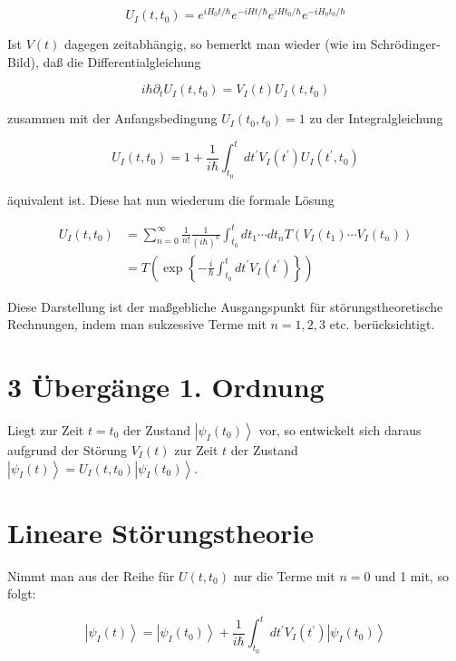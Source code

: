 \documentclass[10pt, letterpaper]{article}
\begin{document}
$$
U_{I}\left(t, t_{0}\right)=e^{i H_{0} t / \hbar} e^{-i H t / \hbar} e^{i H t_{0} / \hbar} e^{-i H_{0} t_{0} / \hbar}
$$

Ist $V(t)$ dagegen zeitabhängig, so bemerkt man wieder (wie im Schrödinger-Bild), daß die Differentialgleichung

$$
i \hbar \partial_{t} U_{I}\left(t, t_{0}\right)=V_{I}(t) U_{I}\left(t, t_{0}\right)
$$

zusammen mit der Anfangsbedingung $U_{I}\left(t_{0}, t_{0}\right)=1$ zu der Integralgleichung

$$
U_{I}\left(t, t_{0}\right)=1+\frac{1}{i \hbar} \int_{t_{0}}^{t} d t^{\prime} V_{I}\left(t^{\prime}\right) U_{I}\left(t^{\prime}, t_{0}\right)
$$

äquivalent ist. Diese hat nun wiederum die formale Lösung

$$
\begin{aligned}
U_{I}\left(t, t_{0}\right) & =\sum_{n=0}^{\infty} \frac{1}{n!} \frac{1}{(i \hbar)^{n}} \int_{t_{0}}^{t} d t_{1} \cdots d t_{n} T\left(V_{I}\left(t_{1}\right) \cdots V_{I}\left(t_{n}\right)\right) \\
& =T\left(\exp \left\{-\frac{i}{\hbar} \int_{t_{0}}^{t} d t^{\prime} V_{I}\left(t^{\prime}\right)\right\}\right)
\end{aligned}
$$

Diese Darstellung ist der maßgebliche Ausgangspunkt für störungstheoretische Rechnungen, indem man sukzessive Terme mit $n=1,2,3$ etc. berücksichtigt.

\section*{3 Übergänge 1. Ordnung}
Liegt zur Zeit $t=t_{0}$ der Zustand $\left|\psi_{I}\left(t_{0}\right)\right\rangle$ vor, so entwickelt sich daraus aufgrund der Störung $V_{I}(t)$ zur Zeit $t$ der Zustand $\left|\psi_{I}(t)\right\rangle=U_{I}\left(t, t_{0}\right)\left|\psi_{I}\left(t_{0}\right)\right\rangle$.

\section*{Lineare Störungstheorie}
Nimmt man aus der Reihe für $U\left(t, t_{0}\right)$ nur die Terme mit $n=0$ und 1 mit, so folgt:

$$
\left|\psi_{I}(t)\right\rangle=\left|\psi_{I}\left(t_{0}\right)\right\rangle+\frac{1}{i \hbar} \int_{t_{0}}^{t} d t^{\prime} V_{I}\left(t^{\prime}\right)\left|\psi_{I}\left(t_{0}\right)\right\rangle
$$
\end{document}
